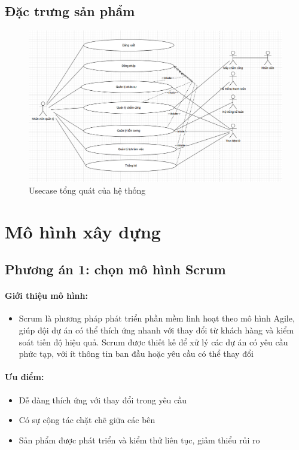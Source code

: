 \subsection{Đặc trưng sản phẩm}
\begin{figure}[H]
    \centering
    \includegraphics[width=\textwidth]{images/usecase.png}
    \caption{Usecase tổng quát của hệ thống}
    \label{fig:usecase-tong-quat}
\end{figure}

\section{Mô hình xây dựng}
\subsection{Phương án 1: chọn mô hình Scrum}
\paragraph{Giới thiệu mô hình:}
\begin{itemize}
    \item Scrum là phương pháp phát triển phần mềm linh hoạt theo mô hình Agile, giúp đội dự án có thể thích ứng nhanh với thay đổi từ khách hàng và kiểm soát tiến độ hiệu quả. Scrum được thiết kế để xử lý các dự án có yêu cầu phức tạp, với ít thông tin ban đầu hoặc yêu cầu có thể thay đổi
\end{itemize}
\paragraph{Ưu điểm:}
\begin{itemize}
    \item Dễ dàng thích ứng với thay đổi trong yêu cầu
    \item Có sự cộng tác chặt chẽ giữa các bên
    \item Sản phẩm được phát triển và kiểm thử liên tục, giảm thiểu rủi ro
\end{itemize}
